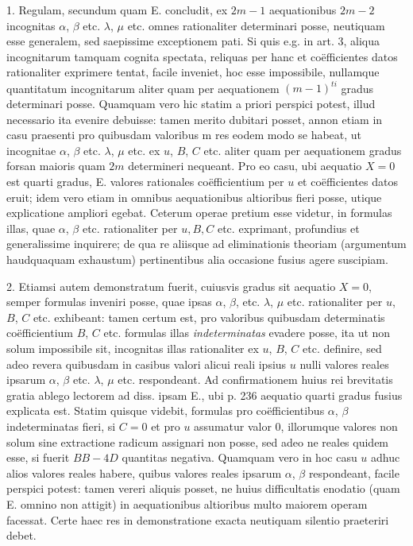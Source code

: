 \documentclass[twoside,12pt, showframe]{memoir}
\begin{document}
1.  Regulam, secundum quam \textsc{E.} concludit, ex \(2m-1\) aequationibus \(2m-2\) incognitas \(\alpha\), \(\beta\) etc{.} \(\lambda\), \(\mu\) etc{.} omnes rationaliter determinari posse, neutiquam esse generalem, sed saepissime exceptionem pati. Si quis e.g. in art. 3, aliqua incognitarum tamquam cognita spectata, reliquas per hanc et co\"efficientes datos rationaliter exprimere tentat, facile inveniet, hoc esse impossibile, nullamque quantitatum incognitarum aliter quam per aequationem \((m-1)^{ti}\) gradus determinari posse. Quamquam vero hic statim a priori perspici potest, illud necessario ita evenire debuisse: tamen merito dubitari posset, annon etiam in casu praesenti pro quibusdam valoribus m res eodem modo se habeat, ut incognitae \(\alpha\), \(\beta\) etc{.} \(\lambda\), \(\mu\) etc{.} ex \(u\), \(B\), \(C\) etc{.} aliter quam per aequationem gradus forsan maioris quam \(2m\) determineri nequeant. Pro eo casu, ubi aequatio \(X = 0\) est quarti gradus, \textsc{E.} valores rationales co\"efficientium per \(u\) et co\"efficientes datos eruit; idem vero etiam in omnibus aequationibus altioribus fieri posse, utique explicatione ampliori egebat.   Ceterum operae pretium esse videtur, in formulas illas, quae \(\alpha\), \(\beta\) etc{.} rationaliter per \(u, B, C\) etc{.} exprimant, profundius et generalissime inquirere; de qua re aliisque ad eliminationis theoriam (argumentum haudquaquam exhaustum) pertinentibus alia occasione fusius agere suscipiam.

2.  Etiamsi autem demonstratum fuerit, cuiusvis gradus sit aequatio \(X = 0\), semper formulas inveniri posse, quae ipsas \(\alpha\), \(\beta\),  etc{.} \(\lambda\), \(\mu\) etc{.} rationaliter per \(u\), \(B\), \(C\) etc{.} exhibeant: tamen certum est, pro valoribus quibusdam determinatis co\"efficientium \(B\), \(C\) etc{.} formulas illas \textit{indeterminatas} evadere posse, ita ut non solum impossibile sit, incognitas illas rationaliter ex \(u\), \(B\), \(C\) etc{.} definire, sed adeo revera quibusdam in casibus valori alicui reali ipsius \(u\) nulli valores reales ipsarum \(\alpha\), \(\beta\) etc{.} \(\lambda\), \(\mu\) etc{.} respondeant.  Ad confirmationem huius rei brevitatis gratia ablego lectorem ad diss. ipsam \textsc{E.}, ubi p. 236 aequatio quarti gradus fusius explicata est.   Statim quisque videbit, formulas pro co\"efficientibus \(\alpha\), \(\beta\) indeterminatas fieri, si \(C = 0\) et pro \(u\) assumatur valor \(0\), illorumque valores non solum sine extractione radicum assignari non posse, sed adeo ne reales quidem esse, si fuerit \(BB-4D\) quantitas negativa. Quamquam vero in hoc casu \(u\) adhuc alios valores reales habere, quibus valores reales ipsarum \(\alpha\), \(\beta\) respondeant, facile perspici potest: tamen vereri aliquis posset, ne huius difficultatis enodatio (quam \textsc{E.} omnino non attigit) in aequationibus altioribus multo maiorem operam facessat. Certe haec res in demonstratione exacta neutiquam silentio praeteriri debet.
\end{document}
